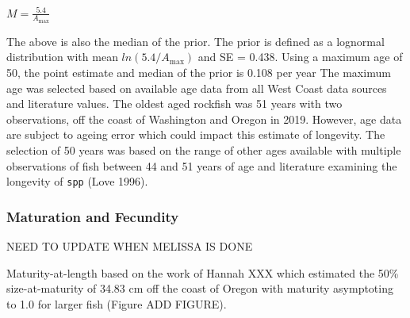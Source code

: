 \documentclass[11pt,
  english,
  a4paper,
]{article}
\begin{document}
\leavevmode\tagmcend\tagstructend\par

\begin{centering}

$M=\frac{5.4}{A_{\text{max}}}$

\end{centering}


The above is also the median of the prior. The prior is defined as a lognormal distribution with mean {\(ln(5.4/A_{\text{max}})\)\leavevmode\tagmcend\tagstructend} and SE = 0.438. Using a maximum age of 50, the point estimate and median of the prior is 0.108 per year The maximum age was selected based on available age data from all West Coast data sources and literature values. The oldest aged rockfish was 51 years with two observations, off the coast of Washington and Oregon in 2019. However, age data are subject to ageing error which could impact this estimate of longevity. The selection of 50 years was based on the range of other ages available with multiple observations of fish between 44 and 51 years of age and literature examining the longevity of \texttt{spp} {(Love 1996)\leavevmode\tagmcend\tagstructend}.

\leavevmode\tagmcend\tagstructend\par


\hypertarget{maturation-and-fecundity}{%
\subsubsection{Maturation and Fecundity}\label{maturation-and-fecundity}}

\leavevmode\tagmcend\tagstructend


NEED TO UPDATE WHEN MELISSA IS DONE

\leavevmode\tagmcend\tagstructend\par


Maturity-at-length based on the work of Hannah XXX which estimated the 50\% size-at-maturity of 34.83 cm off the coast of Oregon with maturity asymptoting to 1.0 for larger fish (Figure ADD FIGURE).
\end{document}
